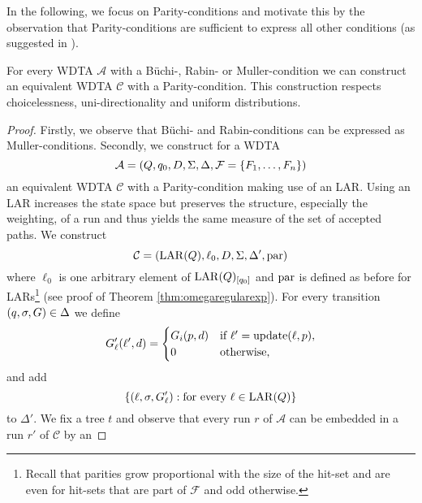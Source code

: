 In the following, we focus on Parity-conditions and motivate this by the
observation that Parity-conditions are sufficient to express all other 
conditions (as suggested in \cite[page 24:9, Proposition 6]{RandAutoInfTrees}).
\begin{lemma}
  For every \ac{WDTA} $\mathcal{A}$ with a Büchi-, Rabin- or Muller-condition 
  we can construct an equivalent \ac{WDTA} $\mathcal{C}$ with a 
  Parity-condition. This construction respects choicelessness,
  uni-directionality and uniform distributions.
  \label{lem:wdtaparityexpressiveness}
\end{lemma}
\begin{proof}
  Firstly, we observe that Büchi- and Rabin-conditions can be expressed
  as Muller-conditions. Secondly, we construct for a 
  \ac{WDTA}
  \begin{equation*}
    \mathcal{A} = \left(
      Q, q_{0}, D, \Sigma, \Delta, \mathcal{F} = \left\{F_{1},\dots,F_{n}\right\}
    \right)
  \end{equation*}
  an equivalent \ac{WDTA} $\mathcal{C}$ with a Parity-condition making use of
  an \ac{LAR}. Using an \ac{LAR} increases the state space but preserves the 
  structure, especially the weighting, of a run and thus yields the same 
  measure of the set of accepted paths. We construct
  \begin{equation*}
    \mathcal{C}=\left(
      \operatorname{LAR}(Q),\ell_{0}, D, \Sigma, \Delta', \operatorname{par}
    \right)
  \end{equation*} 
  where $\ell_{0}$ is one arbitrary element of $\operatorname{LAR}(Q)_{\left[q_{0}\right]}$ and 
  $\operatorname{par}$ is defined as before for \acp{LAR}\footnote{
    Recall that parities grow proportional with the size of the hit-set and are 
    even for hit-sets that are part of $\mathcal{F}$ and odd otherwise.
  } (see proof of Theorem \ref{thm:omegaregularexp}). For every transition 
  $\left(q,\sigma,G\right)\in\Delta$ we define
  \begin{equation*}
    G_{\ell}'(\ell', d) = \begin{cases}
      G_{i}(p,d) &\text{if }\ell' = \operatorname{update}(\ell,p),\\
      0          &\text{otherwise,}
    \end{cases}
  \end{equation*}
  and add
  \begin{equation*}
    \left\{
      \left(\ell,\sigma,G_{\ell}'\right):\text{for every }\ell\in\operatorname{LAR}(Q)
    \right\}
  \end{equation*}
  to $\Delta'$. We fix a tree $t$ and observe that every run $r$ of 
  $\mathcal{A}$ can be embedded in a run $r'$ of $\mathcal{C}$ by an 

\end{proof}
